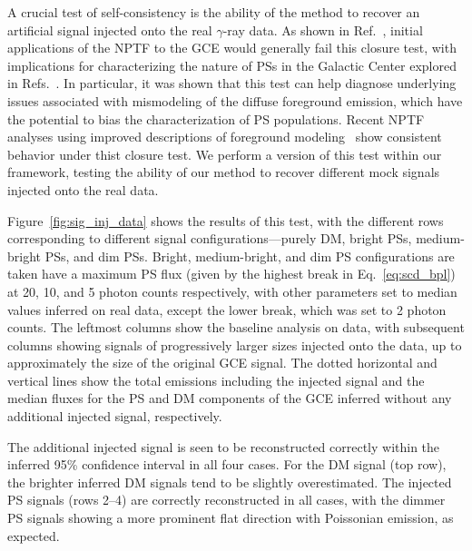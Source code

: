 \documentclass[prd,aps,10pt,nofootinbib,twocolumn,superscriptaddress,preprintnumbers,balancelastpage,longbibliography,floatfix]{revtex4-2}
\begin{document}
A crucial test of self-consistency is the ability of the method to recover an artificial signal injected onto the real $\gamma$-ray data. As shown in Ref.~\cite{Leane:2019xiy}, initial applications of the NPTF to the GCE would generally fail this closure test, with implications for characterizing the nature of PSs in the Galactic Center explored in Refs.~\cite{Chang:2019ars,Buschmann:2020adf}. In particular, it was shown that this test can help diagnose underlying issues associated with mismodeling of the diffuse foreground emission, which have the potential to bias the characterization of PS populations. Recent NPTF analyses using improved descriptions of foreground modeling~\cite{Buschmann:2020adf} show consistent behavior under thist closure test. We perform a version of this test within our framework, testing the ability of our method to recover different mock signals injected onto the real \Fermi data.

Figure~\ref{fig:sig_inj_data} shows the results of this test, with the different rows corresponding to different signal configurations---purely DM, bright PSs, medium-bright PSs, and dim PSs. Bright, medium-bright, and dim PS configurations are taken have a maximum PS flux (given by the highest break in Eq.~\eqref{eq:scd_bpl}) at 20, 10, and 5 photon counts respectively, with other parameters set to median values inferred on real \Fermi data, except the lower break, which was set to 2 photon counts. The leftmost columns show the baseline analysis on \Fermi data, with subsequent columns showing signals of progressively larger sizes injected onto the data, up to approximately the size of the original GCE signal. The dotted horizontal and vertical lines show the total emissions including the injected signal and the median fluxes for the PS and DM components of the GCE inferred without any additional injected signal, respectively. 

The additional injected signal is seen to be reconstructed correctly within the inferred 95\% confidence interval in all four cases. For the DM signal (top row), the brighter inferred DM signals tend to be slightly overestimated. The injected PS signals (rows 2--4) are correctly reconstructed in all cases, with the dimmer PS signals showing a more prominent flat direction with Poissonian emission, as expected.
\end{document}
